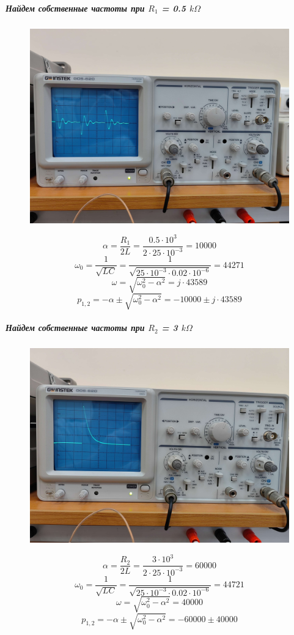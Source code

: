 \documentclass[a4paper,12pt]{report}
\begin{document}
\begin{flushleft}
  
\subparagraph*{Найдем собственные частоты при $R_1$ = 0.5 $k\Omega$}
\begin{figure}[h!]
  \includegraphics[width=1\textwidth]{graph2.jpg}
  \label{ris:image4}
\end{figure}
\[ \alpha = \frac{R_1}{2L} = \frac{0.5\cdot 10^3}{2\cdot 25\cdot 10^{-3}} = 10000 \]
\[ \omega_0 = \frac{1}{\sqrt{LC}} = \frac{1}{\sqrt{25\cdot 10^{-3}\cdot 0.02\cdot 10^{-6}}} = 44271 \]
\[ \omega = \sqrt{\omega_0^2 - \alpha^2} = j\cdot 43589 \]
\[ p_{1,2} = -\alpha \pm \sqrt{\omega_0^2 - \alpha^2} = -10000 \pm j\cdot 43589 \]
\newpage
\subparagraph*{Найдем собственные частоты при $R_2$ = 3 $k\Omega$}
\begin{figure}[h!]
  \includegraphics[width=1\textwidth]{graph3.jpg}
  \label{ris:image5}
\end{figure}
\[ \alpha = \frac{R_2}{2L} = \frac{3\cdot 10^3}{2\cdot 25\cdot 10^{-3}} = 60000 \]
\[ \omega_0 = \frac{1}{\sqrt{LC}} = \frac{1}{\sqrt{25\cdot 10^{-3}\cdot 0.02\cdot 10^{-6}}} =  44721\]
\[ \omega = \sqrt{\omega_0^2 - \alpha^2} = 40000 \]
\[ p_{1,2} = -\alpha \pm \sqrt{\omega_0^2 - \alpha^2} = -60000 \pm  40000 \]


\end{flushleft}
\end{document}
